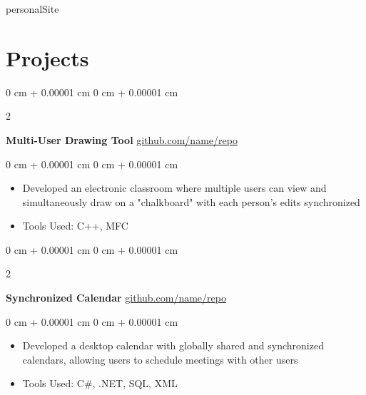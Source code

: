 personalSite\documentclass[10pt, letterpaper]{article}
\newenvironment{highlights}{
    \begin{itemize}[
        topsep=0.10 cm,
        parsep=0.10 cm,
        partopsep=0pt,
        itemsep=0pt,
        leftmargin=0 cm + 10pt
    ]
}{
    \end{itemize}
} %
\newenvironment{onecolentry}{
    \begin{adjustwidth}{
        0 cm + 0.00001 cm
    }{
        0 cm + 0.00001 cm
    }
}{
    \end{adjustwidth}
} %
\newenvironment{twocolentry}[2][]{
    \onecolentry
    \def\secondColumn{#2}
    \setcolumnwidth{\fill, 4.5 cm}
    \begin{paracol}{2}
}{
    \switchcolumn \raggedleft \secondColumn
    \end{paracol}
    \endonecolentry
} %
\begin{document}
            

                


    
    \section{Projects}



        
        \begin{twocolentry}{
            \href{https://github.com/sinaatalay/rendercv}{github.com/name/repo}
        }
            \textbf{Multi-User Drawing Tool}\end{twocolentry}

        \vspace{0.10 cm}
        \begin{onecolentry}
            \begin{highlights}
                \item Developed an electronic classroom where multiple users can view and simultaneously draw on a "chalkboard" with each person's edits synchronized
                \item Tools Used: C++, MFC
            \end{highlights}
        \end{onecolentry}


        \vspace{0.2 cm}

        \begin{twocolentry}{
            \href{https://github.com/sinaatalay/rendercv}{github.com/name/repo}
        }
            \textbf{Synchronized Calendar}\end{twocolentry}

        \vspace{0.10 cm} 
        \begin{onecolentry}
            \begin{highlights}
                \item Developed a desktop calendar with globally shared and synchronized calendars, allowing users to schedule meetings with other users
                \item Tools Used: C\#, .NET, SQL, XML
            \end{highlights}
        \end{onecolentry}
\end{document}
